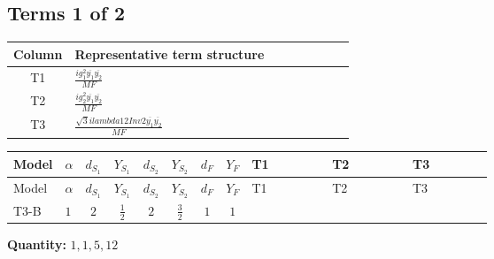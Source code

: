\documentclass[8pt]{article}
\begin{document}
\begin{landscape}
\subsection*{Terms 1 of 2}
\begin{center}
\begin{tabular}{@{}c >{\raggedright\arraybackslash}p{0.82\linewidth}@{}}
\toprule
Column & Representative term structure \\
\midrule
T1 & \(\displaystyle \frac{i g_{1}^{2} \overline{y_{1}} \overline{y_{2}}}{MF}\) \\
\midrule
T2 & \(\displaystyle \frac{i g_{2}^{2} \overline{y_{1}} \overline{y_{2}}}{MF}\) \\
\midrule
T3 & \(\displaystyle \frac{\sqrt{3} i lambda12Inv2 \overline{y_{1}} \overline{y_{2}}}{MF}\) \\
\midrule
\bottomrule
\end{tabular}
\end{center}
\smallskip
\tiny
\begin{longtable}{@{}llcccccc >{\raggedright\arraybackslash}p{0.21\linewidth} >{\raggedright\arraybackslash}p{0.21\linewidth} >{\raggedright\arraybackslash}p{0.21\linewidth}@{}}
\toprule
Model & $\alpha$ & $d_{S_1}$ & $Y_{S_1}$ & $d_{S_2}$ & $Y_{S_2}$ & $d_F$ & $Y_F$ & T1 & T2 & T3 \\
\midrule
\endfirsthead
\toprule
Model & $\alpha$ & $d_{S_1}$ & $Y_{S_1}$ & $d_{S_2}$ & $Y_{S_2}$ & $d_F$ & $Y_F$ & T1 & T2 & T3 \\
\midrule
\endhead
T3-B & $1$ & $2$ & $\frac{1}{2}$ & $2$ & $\frac{3}{2}$ & $1$ & $1$ & \scriptsize\adjustbox{max width=\linewidth}{$\begin{gathered} - \frac{3 i g_{1}^{2} \overline{y_{1}} \overline{y_{2}}}{2 MF}\end{gathered}$} & \scriptsize\adjustbox{max width=\linewidth}{$\begin{gathered} - \frac{3 i g_{2}^{2} \overline{y_{1}} \overline{y_{2}}}{4 MF}\end{gathered}$} & \scriptsize\adjustbox{max width=\linewidth}{$\begin{gathered} - \frac{\sqrt{3} i lambda12Inv2 \overline{y_{1}} \overline{y_{2}}}{3 MF}\end{gathered}$} \\
\midrule
\bottomrule
\end{longtable}
\clearpage
\noindent\textbf{Quantity: }$\mathrm{1,1,5,12}$\par\smallskip

\end{landscape}
\end{document}
